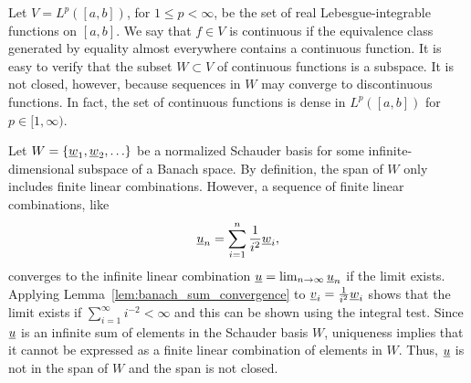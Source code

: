 \begin{example}
Let $V = L^p ( [a,b] )$, for $1\leq p <\infty$, be the set of real Lebesgue-integrable functions on $[a,b]$.
We say that $f \in V$ is continuous if the equivalence class generated by equality almost everywhere contains a continuous function.
It is easy to verify that the subset $W \subset V$ of continuous functions is a subspace.
It is not closed, however, because sequences in $W$ may converge to discontinuous functions.
In fact,  the set of continuous functions is dense in $L^p ([a,b])$ for $p\in[1,\infty)$. %
\end{example}
\begin{example}
Let $W = \{\underline{w}_1 ,\underline{w}_2 , \ldots \}$ be a normalized Schauder basis for some infinite-dimensional subspace of a Banach space.
By definition, the span of $W$ only includes finite linear combinations.
However, a sequence of finite linear combinations, like 
\[ \underline{u}_n = \sum_{i=1}^n \frac{1}{i^2} \underline{w}_i , \]
converges to the infinite linear combination $\underline{u} = \lim_{n\to \infty} \underline{u}_n$ if the limit exists.
Applying Lemma~\ref{lem:banach_sum_convergence} to $\underline{v}_i = \frac{1}{i^2} \underline{w}_i$ shows that the limit exists if $\sum_{i=1}^\infty i^{-2} < \infty$ and this can be shown using the integral test.
Since $\underline{u}$ is an infinite sum of elements in the Schauder basis $W$, uniqueness implies that it cannot be expressed as a finite linear combination of elements in $W$.
Thus, $\underline{u}$ is not in the span of $W$ and the span is not closed.
\end{example}

